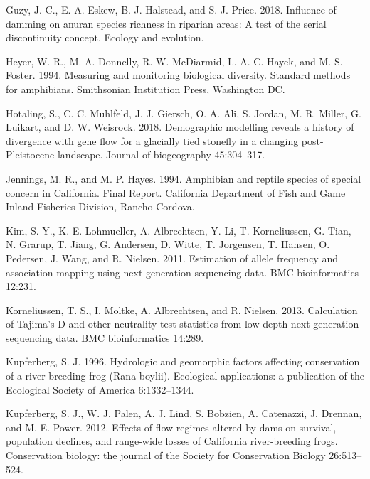 \documentclass[proquest,12pt,final]{ucthesis-CA2012} %
\begin{document}
\begin{ucmainmatter}
\leavevmode\hypertarget{ref-guzy_influence_2018}{}%
Guzy, J. C., E. A. Eskew, B. J. Halstead, and S. J. Price. 2018.
Influence of damming on anuran species richness in riparian areas: A
test of the serial discontinuity concept. Ecology and evolution.

\leavevmode\hypertarget{ref-heyer_measuring_1994}{}%
Heyer, W. R., M. A. Donnelly, R. W. McDiarmid, L.-A. C. Hayek, and M. S.
Foster. 1994. Measuring and monitoring biological diversity. Standard
methods for amphibians. Smithsonian Institution Press, Washington DC.

\leavevmode\hypertarget{ref-hotaling_demographic_2018}{}%
Hotaling, S., C. C. Muhlfeld, J. J. Giersch, O. A. Ali, S. Jordan, M. R.
Miller, G. Luikart, and D. W. Weisrock. 2018. Demographic modelling
reveals a history of divergence with gene flow for a glacially tied
stonefly in a changing post-Pleistocene landscape. Journal of
biogeography 45:304--317.

\leavevmode\hypertarget{ref-jennings_amphibian_1994}{}%
Jennings, M. R., and M. P. Hayes. 1994. Amphibian and reptile species of
special concern in California. Final Report. California Department of
Fish and Game Inland Fisheries Division, Rancho Cordova.

\leavevmode\hypertarget{ref-kim_estimation_2011}{}%
Kim, S. Y., K. E. Lohmueller, A. Albrechtsen, Y. Li, T. Korneliussen, G.
Tian, N. Grarup, T. Jiang, G. Andersen, D. Witte, T. Jorgensen, T.
Hansen, O. Pedersen, J. Wang, and R. Nielsen. 2011. Estimation of allele
frequency and association mapping using next-generation sequencing data.
BMC bioinformatics 12:231.

\leavevmode\hypertarget{ref-korneliussen_calculation_2013}{}%
Korneliussen, T. S., I. Moltke, A. Albrechtsen, and R. Nielsen. 2013.
Calculation of Tajima's D and other neutrality test statistics from low
depth next-generation sequencing data. BMC bioinformatics 14:289.

\leavevmode\hypertarget{ref-kupferberg_hydrologic_1996}{}%
Kupferberg, S. J. 1996. Hydrologic and geomorphic factors affecting
conservation of a river-breeding frog (Rana boylii). Ecological
applications: a publication of the Ecological Society of America
6:1332--1344.

\leavevmode\hypertarget{ref-kupferberg_effects_2012}{}%
Kupferberg, S. J., W. J. Palen, A. J. Lind, S. Bobzien, A. Catenazzi, J.
Drennan, and M. E. Power. 2012. Effects of flow regimes altered by dams
on survival, population declines, and range-wide losses of California
river-breeding frogs. Conservation biology: the journal of the Society
for Conservation Biology 26:513--524.


\end{ucmainmatter}
\end{document}
